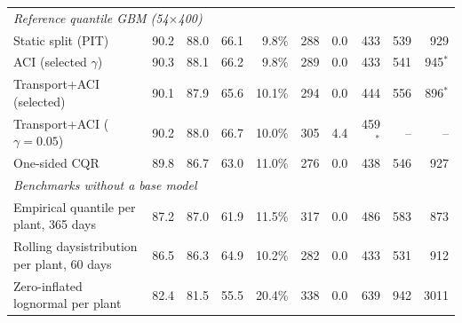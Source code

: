 \begin{table}[tp]
\begin{tabular}{l rrrr rr rrr}
\multicolumn{10}{l}{\textit{Reference quantile GBM (54$\times$400)}} \\
\quad Static split (PIT) & 90.2 & 88.0 & 66.1 & 9.8\% & 288 & 0.0 & 433 & 539 & 929 \\
\quad ACI (selected $\gamma$) & 90.3 & 88.1 & 66.2 & 9.8\% & 289 & 0.0 & 433 & 541 & 945$^\ast$ \\
\quad Transport+ACI (selected) & 90.1 & 87.9 & 65.6 & 10.1\% & 294 & 0.0 & 444 & 556 & 896$^\ast$ \\
\quad Transport+ACI ($\gamma=0.05$) & 90.2 & 88.0 & 66.7 & 10.0\% & 305 & 4.4 & 459$^\ast$ & -- & -- \\
\quad One-sided CQR & 89.8 & 86.7 & 63.0 & 11.0\% & 276 & 0.0 & 438 & 546 & 927 \\
\multicolumn{10}{l}{\textit{Benchmarks without a base model}} \\
\quad Empirical quantile per plant, 365 days & 87.2 & 87.0 & 61.9 & 11.5\% & 317 & 0.0 & 486 & 583 & 873 \\
\quad Rolling daysistribution per plant, 60 days & 86.5 & 86.3 & 64.9 & 10.2\% & 282 & 0.0 & 433 & 531 & 912 \\
\quad Zero-inflated lognormal per plant & 82.4 & 81.5 & 55.5 & 20.4\% & 338 & 0.0 & 639 & 942 & 3011 \\
\bottomrule
\end{tabular}
\end{table}
